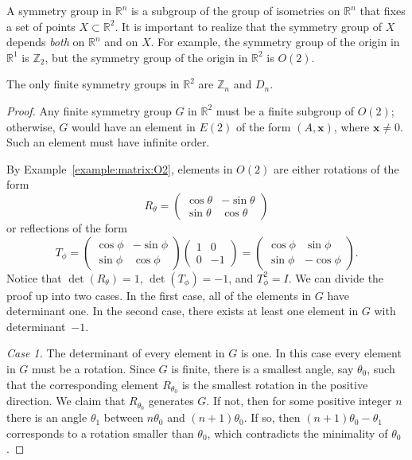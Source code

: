  
A {\bfi symmetry group\/} in ${\mathbb R}^n$ is a
subgroup of the group of isometries on ${\mathbb R}^n$ that fixes a set
of points $X \subset {\mathbb R}^2$.  It is important to realize that the
symmetry group of $X$ depends {\em both\/} on ${\mathbb R}^n$ and on
$X$. For example, the symmetry group of the origin in ${\mathbb R}^1$ is
${\mathbb Z}_2$, but the symmetry group of the origin in ${\mathbb R}^2$ is
$O(2)$. 
 
 
\begin{theorem}
The only finite symmetry groups in ${\mathbb R}^2$ are ${\mathbb Z}_n$ and
$D_n$. 
\end{theorem}
 
 
\begin{proof}
Any finite symmetry group $G$ in ${\mathbb R}^2$ must be a finite
subgroup of $O(2)$; otherwise, $G$ would have an element in $E(2)$ of
the form $(A, {\mathbf x})$, where ${\mathbf x} \neq 0$.  Such an element
must have infinite order. 
 
 
 
 
By Example~\ref{example:matrix:O2}, elements in $O(2)$ are either rotations of the form
\[
R_{\theta}
=
\begin{pmatrix}
\cos \theta & - \sin \theta \\
\sin \theta & \cos \theta
\end{pmatrix}
\]
or reflections of the form
\[T_{\phi}
=
\begin{pmatrix}
\cos \phi &  - \sin \phi \\
\sin \phi & \cos \phi
\end{pmatrix}
\begin{pmatrix}
1 & 0 \\
0 & -1
\end{pmatrix}
=
\begin{pmatrix}
\cos \phi &  \sin \phi \\
\sin \phi & - \cos \phi
\end{pmatrix}.
\]
Notice that $\det(R_{\theta})=1$,  $\det(T_{\phi})=-1$,
and $T_{\phi}^2=I$. We can divide the proof up into two cases.  In
the first case, all of the elements in $G$ have determinant one. In the
second case, there exists at least one element in $G$ with 
determinant~$-1$.  
 
 
{\em Case 1.}  
The determinant of every element in $G$ is one. In this case every
element in $G$ must be a rotation. Since $G$ is finite, there is a
smallest angle, say $\theta_0$, such that the corresponding element
$R_{\theta_0}$ is the smallest rotation in the positive direction.  We
claim that $R_{\theta_0}$ generates $G$.  If not, then for some
positive integer $n$ there is an angle $\theta_1$ between $n \theta_0$
and $(n+1) \theta_0$. If so, then $(n+1) \theta_0 - \theta_1$
corresponds to a rotation smaller than $\theta_0$, which contradicts
the minimality of $\theta_0$.   
 

\end{proof}

